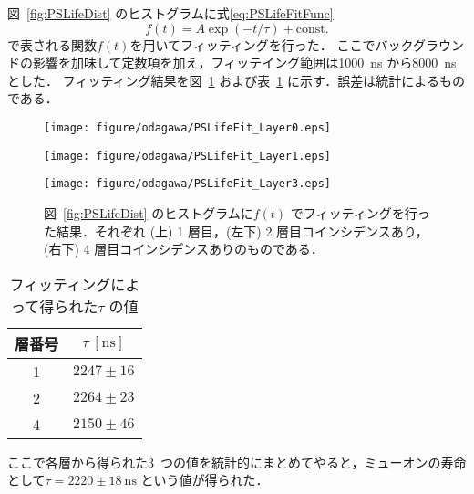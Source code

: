 図~\ref{fig:PSLifeDist} のヒストグラムに式\eqref{eq:PSLifeFitFunc} 
\begin{equation}
f(t) = A \exp(-t / \tau) + \mathrm{const.}
\label{eq:PSLifeFitFunc}
\end{equation}
で表される関数$f(t)$を用いてフィッティングを行った．
ここでバックグラウンドの影響を加味して定数項を加え，フィッテイング範囲は1000~ns から8000~ns とした．
フィッティング結果を図~\ref{fig:PSLifeFit} および表~\ref{tab:PSLifetime} に示す．誤差は統計によるものである．
\begin{figure}[h]
	\centering
	\texttt{[image: figure/odagawa/PSLifeFit\_Layer0.eps]}\\
	\begin{minipage}{0.45\textwidth}
	\centering
	\texttt{[image: figure/odagawa/PSLifeFit\_Layer1.eps]}
	\end{minipage}
	\begin{minipage}{0.45\textwidth}
	\centering
	\texttt{[image: figure/odagawa/PSLifeFit\_Layer3.eps]}
	\end{minipage}
	\caption{図~\ref{fig:PSLifeDist} のヒストグラムに$f(t)$ でフィッティングを行った結果．それぞれ (上) 1 層目，(左下) 2 層目コインシデンスあり，(右下) 4 層目コインシデンスありのものである．}
	\label{fig:PSLifeFit}
\end{figure}%
\begin{table}[h]
	\centering
	\caption{フィッティングによって得られた$\tau$ の値}
	\begin{tabular}{cc}\toprule
	層番号 & $\tau~[\mathrm{ns}]$ \\ \midrule
	1 & $2247 \pm 16$ \\
	2 & $2264 \pm 23$ \\
	4 & $2150 \pm 46$ \\ \bottomrule
	\end{tabular}\label{tab:PSLifetime}
\end{table}%

ここで各層から得られた3~つの値を統計的にまとめてやると，ミューオンの寿命として$\tau = 2220 \pm 18~\mathrm{ns}$ という値が得られた．

\newpage

